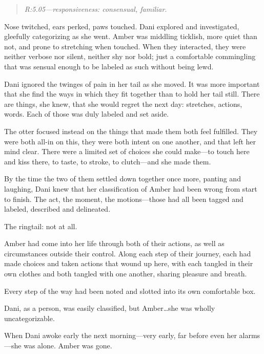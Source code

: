 \vspace{-0.2cm}
\begin{quote}
\emph{R:5.05---responsiveness: consensual, familiar}.
\end{quote}
\vspace{-0.2cm}

Nose twitched, ears perked, paws touched. Dani explored and investigated, gleefully categorizing as she went. Amber was middling ticklish, more quiet than not, and prone to stretching when touched. When they interacted, they were neither verbose nor silent, neither shy nor bold; just a comfortable commingling that was sensual enough to be labeled as such without being lewd.

Dani ignored the twinges of pain in her tail as she moved. It was more important that she find the ways in which they fit together than to hold her tail still. There are things, she knew, that she would regret the next day: stretches, actions, words. Each of those was duly labeled and set aside.

The otter focused instead on the things that made them both feel fulfilled. They were both all-in on this, they were both intent on one another, and that left her mind clear. There were a limited set of choices she could make---to touch here and kiss there, to taste, to stroke, to clutch---and she made them.

By the time the two of them settled down together once more, panting and laughing, Dani knew that her classification of Amber had been wrong from start to finish. The act, the moment, the motions---those had all been tagged and labeled, described and delineated.

The ringtail: not at all.

Amber had come into her life through both of their actions, as well as circumstances outside their control. Along each step of their journey, each had made choices and taken actions that wound up here, with each tangled in their own clothes and both tangled with one another, sharing pleasure and breath.

Every step of the way had been noted and slotted into its own comfortable box.

Dani, as a person, was easily classified, but Amber\ldots{}she was wholly uncategorizable.

\secdiv{}

\noindent When Dani awoke early the next morning---very early, far before even her alarms---she was alone. Amber was gone.

